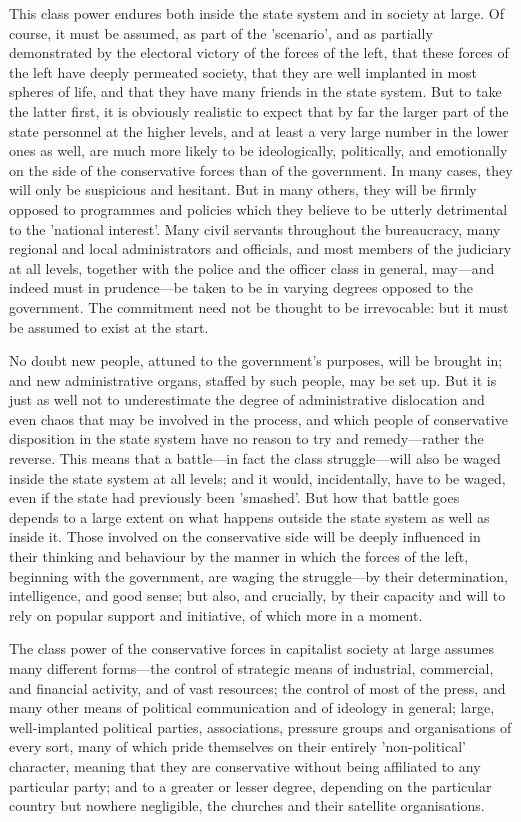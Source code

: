 This class power endures both inside the state system and in society at large. Of course, it must be assumed, as part of the 'scenario', and as partially demonstrated by the electoral victory of the forces of the left, that these forces of the left have deeply permeated society, that they are well implanted in most spheres of life, and that they have many friends in the state system. But to take the latter first, it is obviously realistic to expect that by far the larger part of the state personnel at the higher levels, and at least a very large number in the lower ones as well, are much more likely to be ideologically, politically, and emotionally on the side of the conservative forces than of the government. In many cases, they will only be suspicious and hesitant. But in many others, they will be firmly opposed to programmes and policies which they believe to be utterly detrimental to the 'national interest'. Many civil servants throughout the bureaucracy, many regional and local administrators and officials, and most members of the judiciary at all levels, together with the police and the officer class in general, may—and indeed must in prudence—be taken to be in varying degrees opposed to the government. The commitment need not be thought to be irrevocable: but it must be assumed to exist at the start.

No doubt new people, attuned to the government's purposes, will be brought in; and new administrative organs, staffed by such people, may be set up. But it is just as well not to underestimate the degree of administrative dislocation and even chaos that may be involved in the process, and which people of conservative disposition in the state system have no reason to try and remedy—rather the reverse. This means that a battle—in fact the class struggle—will also be waged inside the state system at all levels; and it would, incidentally, have to be waged, even if the state had previously been 'smashed'. But how that battle goes depends to a large extent on what happens outside the state system as well as inside it. Those involved on the conservative side will be deeply influenced in their thinking and behaviour by the manner in which the forces of the left, beginning with the government, are waging the struggle—by their determination, intelligence, and good sense; but also, and crucially, by their capacity and will to rely on popular support and initiative, of which more in a moment.

The class power of the conservative forces in capitalist society at large assumes many different forms—the control of strategic means of industrial, commercial, and financial activity, and of vast resources; the control of most of the press, and many other  means of political communication and of ideology in general; large, well-implanted political parties, associations, pressure groups and organisations of every sort, many of which pride themselves on their entirely 'non-political' character, meaning that they are conservative without being affiliated to any particular party; and to a greater or lesser degree, depending on the particular country but nowhere negligible, the churches and their satellite organisations.

